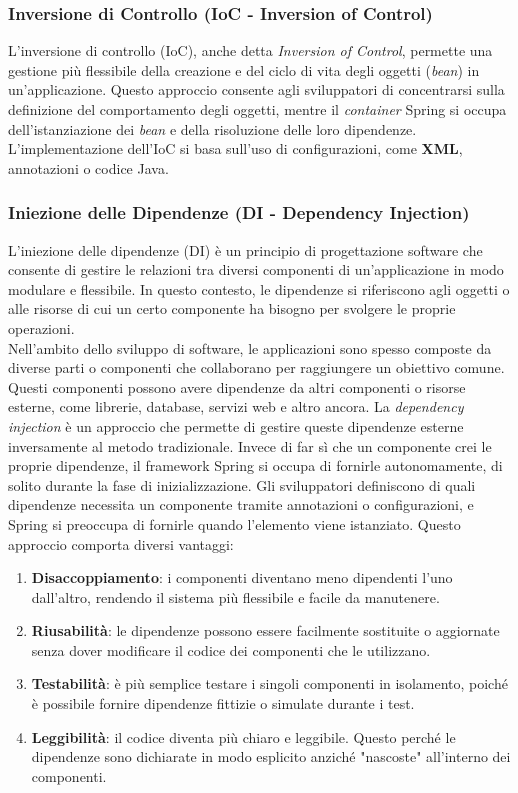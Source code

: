 \subsubsection{Inversione di Controllo (IoC - Inversion of Control)}

L'inversione di controllo (IoC), anche detta \textit{Inversion of Control}, permette una gestione più flessibile della creazione e del ciclo di vita degli oggetti (\textit{bean}) in un'applicazione. Questo approccio consente agli sviluppatori di concentrarsi sulla definizione del comportamento degli oggetti, mentre il \textit{container} Spring si occupa dell'istanziazione dei \textit{bean} e della risoluzione delle loro dipendenze. L'implementazione dell'IoC si basa sull'uso di configurazioni, come \textbf{XML}, annotazioni o codice Java.\cite{SPRING_italiancoders}\cite{SPRING_baeldung2}

\subsubsection{Iniezione delle Dipendenze (DI - Dependency Injection)}

L’iniezione delle dipendenze (DI) è un principio di progettazione software che consente di gestire le relazioni tra diversi componenti di un'applicazione in modo modulare e flessibile. In questo contesto, le dipendenze si riferiscono agli oggetti o alle risorse di cui un certo componente ha bisogno per svolgere le proprie operazioni.\\
Nell'ambito dello sviluppo di software, le applicazioni sono spesso composte da diverse parti o componenti che collaborano per raggiungere un obiettivo comune. Questi componenti possono avere dipendenze da altri componenti o risorse esterne, come librerie, database, servizi web e altro ancora.
La \textit{dependency injection} è un approccio che permette di gestire queste dipendenze esterne inversamente al metodo tradizionale. Invece di far sì che un componente crei le proprie dipendenze, il framework Spring si occupa di fornirle autonomamente,\cite{SPRING_italiancoders} di solito durante la fase di inizializzazione.
Gli sviluppatori definiscono di quali dipendenze necessita un componente tramite annotazioni o configurazioni, e Spring si preoccupa di fornirle quando l’elemento viene istanziato. Questo approccio comporta diversi vantaggi:
\begin{enumerate}
    \item \textbf{Disaccoppiamento}: i componenti diventano meno dipendenti l'uno dall'altro, rendendo il sistema più flessibile e facile da manutenere.
    \item \textbf{Riusabilità}: le dipendenze possono essere facilmente sostituite o aggiornate senza dover modificare il codice dei componenti che le utilizzano.
    \item \textbf{Testabilità}: è più semplice testare i singoli componenti in isolamento, poiché è possibile fornire dipendenze fittizie o simulate durante i test.
    \item \textbf{Leggibilità}: il codice diventa più chiaro e leggibile. Questo perché le dipendenze sono dichiarate in modo esplicito anziché "nascoste" all'interno dei componenti.
\end{enumerate}

